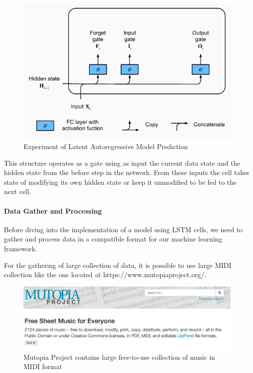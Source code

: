 \begin{figure}[h!]
  \includegraphics[width=\linewidth]{image/fig_JDF14.png}
  \caption{Experiment of Latent Autoregressive Model Prediction}
\end{figure}


This structure operates as a gate using as input the current data state and the hidden
state from the before step in the network. From these inputs the cell takes state of
modifying its own hidden state or keep it unmodified to be fed to the next cell.

\paragraph{Data Gather and Processing} Before diving into the implementation of a model
using LSTM cells, we need to gather and process data in a compatible format for our
machine learning framework.

For the gathering of large collection of data, it is possible to use large MIDI collection
like the one located at https://www.mutopiaproject.org/.

\begin{figure}[h!]
  \includegraphics[width=\linewidth]{image/fig_JDF15.png}
  \caption{Mutopia Project contains large free-to-use collection of music in MIDI format }
\end{figure}


